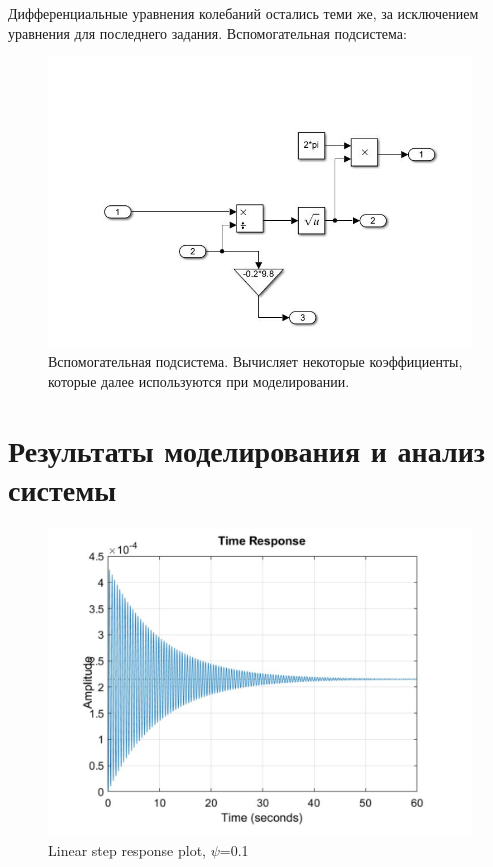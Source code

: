 \documentclass{article}
\begin{document}
	Дифференциальные уравнения колебаний остались теми же, за исключением уравнения для последнего задания.
	Вспомогательная подсистема:
	\begin{figure}[H]
		\centering
		\includegraphics[width=0.7\linewidth]{koef}
		\caption{Вспомогательная подсистема. Вычисляет некоторые коэффициенты, которые далее используются при моделировании.}
		\label{fig:koef}
	\end{figure}
	\section*{Результаты моделирования и анализ системы}
	\begin{figure}[H]
		\centering
		\includegraphics[width=0.7\linewidth]{graph1}
		\caption{Linear step response plot, $\psi$=0.1}
		\label{fig:graph1}
	\end{figure}
	
\end{document}
